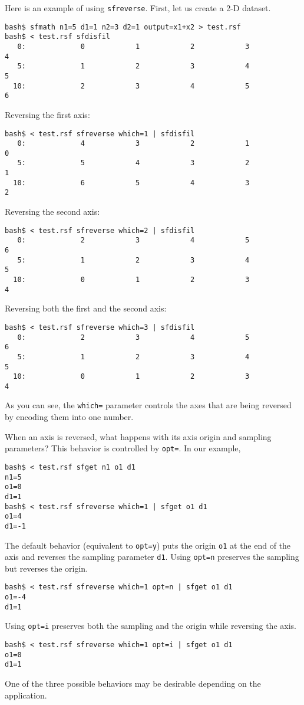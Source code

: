 Here is an example of using \texttt{sfreverse}. First, let us create a
2-D dataset.
\begin{verbatim}
bash$ sfmath n1=5 d1=1 n2=3 d2=1 output=x1+x2 > test.rsf
bash$ < test.rsf sfdisfil
   0:             0            1            2            3            4
   5:             1            2            3            4            5
  10:             2            3            4            5            6
\end{verbatim}
Reversing the first axis:
\begin{verbatim}
bash$ < test.rsf sfreverse which=1 | sfdisfil
   0:             4            3            2            1            0
   5:             5            4            3            2            1
  10:             6            5            4            3            2
\end{verbatim}
Reversing the second axis:
\begin{verbatim}
bash$ < test.rsf sfreverse which=2 | sfdisfil
   0:             2            3            4            5            6
   5:             1            2            3            4            5
  10:             0            1            2            3            4
\end{verbatim}
Reversing both the first and the second axis:
\begin{verbatim}
bash$ < test.rsf sfreverse which=3 | sfdisfil
   0:             2            3            4            5            6
   5:             1            2            3            4            5
  10:             0            1            2            3            4
\end{verbatim}
As you can see, the \texttt{which=} parameter controls the axes that are
being reversed by encoding them into one number.

When an axis is reversed, what happens with its axis origin and
sampling parameters? This behavior is controlled by \texttt{opt=}. In
our example,
\begin{verbatim}
bash$ < test.rsf sfget n1 o1 d1
n1=5
o1=0
d1=1
bash$ < test.rsf sfreverse which=1 | sfget o1 d1
o1=4
d1=-1
\end{verbatim}
The default behavior (equivalent to \texttt{opt=y}) puts the origin
\texttt{o1} at the end of the axis and reverses the sampling parameter
\texttt{d1}.  Using \texttt{opt=n} preserves the sampling but reverses
the origin.
\begin{verbatim}
bash$ < test.rsf sfreverse which=1 opt=n | sfget o1 d1
o1=-4
d1=1
\end{verbatim}
Using \texttt{opt=i} preserves both the sampling and the origin while
reversing the axis.
\begin{verbatim}
bash$ < test.rsf sfreverse which=1 opt=i | sfget o1 d1
o1=0
d1=1
\end{verbatim}
One of the three possible behaviors may be desirable depending on the
application.





